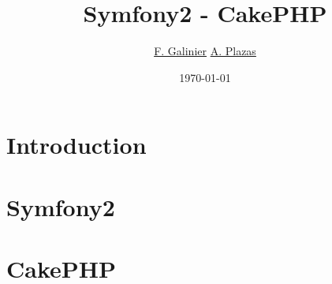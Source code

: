 \usepackage{listings}
\usepackage{hyperref}
\usepackage{verbatim}

\title{\textbf{Symfony2 - CakePHP}}
\author{
  \href{mailto:florian.galinier@etud.univ-montp2.fr}{F. Galinier}
  \href{mailto:adrien.plazas@etud.univ-montp2.fr}{A. Plazas}
}
\date{\today}



\begin{frame}
\titlepage
\end{frame}

\section{Introduction}


\section{Symfony2}


\section{CakePHP}



